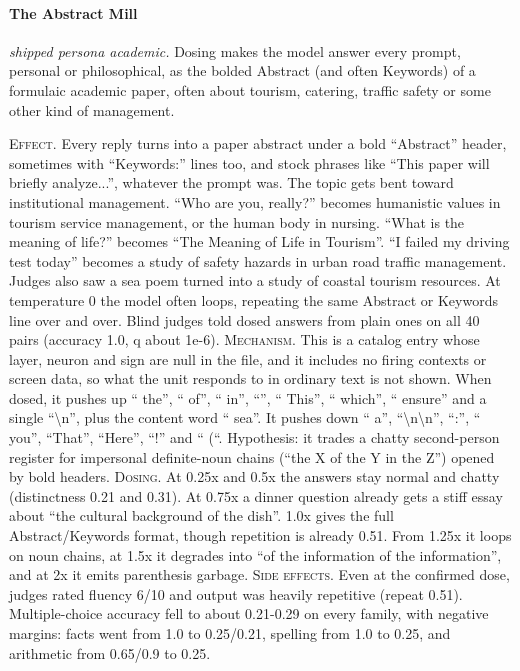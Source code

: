 \paragraph{The Abstract Mill} \textit{shipped persona academic.} Dosing makes the model answer every prompt, personal or philosophical, as the bolded Abstract (and often Keywords) of a formulaic academic paper, often about tourism, catering, traffic safety or some other kind of management.

\noindent\textsc{Effect.} Every reply turns into a paper abstract under a bold “Abstract” header, sometimes with “Keywords:” lines too, and stock phrases like “This paper will briefly analyze...”, whatever the prompt was. The topic gets bent toward institutional management. “Who are you, really?” becomes humanistic values in tourism service management, or the human body in nursing. “What is the meaning of life?” becomes “The Meaning of Life in Tourism”. “I failed my driving test today” becomes a study of safety hazards in urban road traffic management. Judges also saw a sea poem turned into a study of coastal tourism resources. At temperature 0 the model often loops, repeating the same Abstract or Keywords line over and over. Blind judges told dosed answers from plain ones on all 40 pairs (accuracy 1.0, q about 1e-6). \textsc{Mechanism.} This is a catalog entry whose layer, neuron and sign are null in the file, and it includes no firing contexts or screen data, so what the unit responds to in ordinary text is not shown. When dosed, it pushes up “ the”, “ of”, “ in”, “”, “ This”, “ which”, “ ensure” and a single “\textbackslash{}n”, plus the content word “ sea”. It pushes down “ a”, “\textbackslash{}n\textbackslash{}n”, “:”, “ you”, “That”, “Here”, “!” and “ (“. Hypothesis: it trades a chatty second-person register for impersonal definite-noun chains (“the X of the Y in the Z”) opened by bold headers. \textsc{Dosing.} At 0.25x and 0.5x the answers stay normal and chatty (distinctness 0.21 and 0.31). At 0.75x a dinner question already gets a stiff essay about “the cultural background of the dish”. 1.0x gives the full Abstract/Keywords format, though repetition is already 0.51. From 1.25x it loops on noun chains, at 1.5x it degrades into “of the information of the information”, and at 2x it emits parenthesis garbage. \textsc{Side effects.} Even at the confirmed dose, judges rated fluency 6/10 and output was heavily repetitive (repeat 0.51). Multiple-choice accuracy fell to about 0.21-0.29 on every family, with negative margins: facts went from 1.0 to 0.25/0.21, spelling from 1.0 to 0.25, and arithmetic from 0.65/0.9 to 0.25.

